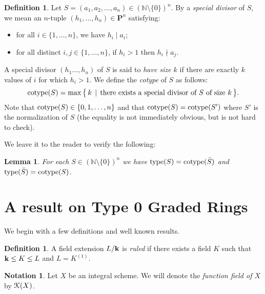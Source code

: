 \documentclass[12pt]{amsart}
\theoremstyle{plain}
\newtheorem{lemma}[subsection]{Lemma}
\theoremstyle{definition}
\newtheorem{definition}[subsection]{Definition}
\newtheorem{notation}[subsection]{Notation}
\newcommand{\type}{		\operatorname{{\rm type}}}
\newcommand{\cotype}{		\operatorname{{\rm cotype}}}
\newcommand{\setspec}[2]{\big\{\,#1\, \mid \,#2\, \big\}}
\newcommand{\Nat}{\ensuremath{\mathbb{N}}}
\newcommand{\bk}{{\ensuremath{\rm \bf k}}}
\newcommand{\Keul}{\EuScript{K}}
\begin{document}
	\begin{definition}
		Let $S = (a_1, a_2, ..., a_n) \in (\Nat \setminus \{0\})^n$.
		By a \textit{special divisor} of $S$, we mean an $n$-tuple $(h_1, \dots, h_n) \in \mathbf{P}^n$ satisfying:
		\begin{itemize}
			
			\item  for all $i \in \{1, \dots, n\}$, we have $h_i \mid a_i$;
			
			\item for all distinct $i,j \in \{1,\dots,n\}$, if $h_i>1$ then $h_i \nmid a_j$.
			
		\end{itemize}
		A special divisor $(h_1 \dots, h_n)$ of $S$ is said to \textit{have size $k$}
		if there are exactly $k$ values of $i$ for which $h_i>1$.
		We define the \textit{cotype} of $S$ as follows:
		$$
		\cotype(S) =  \max \setspec{ k }{ \text{there exists a special divisor of $S$ of size $k$} }.
		$$
		Note that $\cotype(S) \in \{0,1,\dots,n\}$ and that $\cotype(S) = \cotype(S')$ where $S'$ is the normalization of $S$
		(the equality is not immediately obvious, but is not hard to check).
	\end{definition}
	
	
	We leave it to the reader to verify the following:
	
	\begin{lemma} \label {equivalentType2}
		For each $S \in (\Nat\setminus\{0\})^n$ we have
		$\type(S) = \cotype( \bar S )$ and $\type(\bar S) = \cotype( S )$.
	\end{lemma}
	
	
	
	
	\section{A result on Type 0 Graded Rings}
	
	We begin with a few definitions and well known results. 
	
	\begin{definition}
		A field extension $L / \bk$ is \textit{ruled} if there exists a field $K$ such that $\bk \leq K \leq L$ and $L = K^{(1)}$.  
	\end{definition}
	
	\begin{notation} Let $X$ be an integral scheme. We will denote the \textit{function field of $X$} by $\Keul(X)$.
	\end{notation}
	
\end{document}
